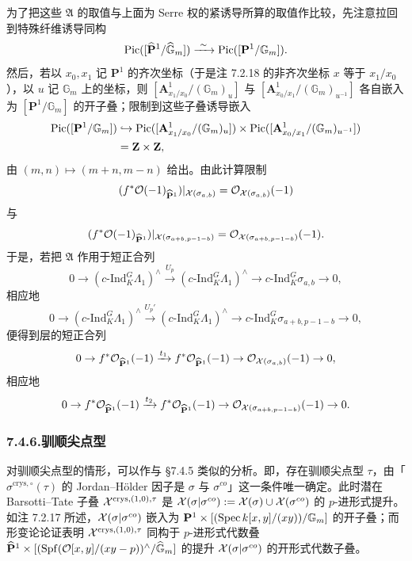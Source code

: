 为了把这些 $\mathfrak A$ 的取值与上面为 Serre 权的紧诱导所算的取值作比较，先注意拉回到特殊纤维诱导同构
\[
\mathrm{Pic}([\widehat{\mathbf P}^1/\widehat{\mathbb G}_m])\xrightarrow{\ \sim\ }\mathrm{Pic}([\mathbf P^1/\mathbb G_m]).
\]
然后，若以 $x_0,x_1$ 记 $\mathbf P^1$ 的齐次坐标（于是注 7.2.18 的非齐次坐标 $x$ 等于 $x_1/x_0$），以 $u$ 记 $\mathbb G_m$ 上的坐标，则 $[\mathbf A^1_{x_1/x_0}/(\mathbb G_m)_u]$ 与 $[\mathbf A^1_{x_0/x_1}/(\mathbb G_m)_{u^{-1}}]$ 各自嵌入为 $[\mathbf P^1/\mathbb G_m]$ 的开子叠；限制到这些子叠诱导嵌入
\[
\begin{aligned}
\mathrm{Pic}([\mathbf P^1/\mathbb G_m])&\hookrightarrow\mathrm{Pic}([\mathbf A^1_{x_1/x_0}/(\mathbb G_m)_u])\times\mathrm{Pic}([\mathbf A^1_{x_0/x_1}/(\mathbb G_m)_{u^{-1}}])\\
&=\mathbf Z\times\mathbf Z,
\end{aligned}
\]
由 $(m,n)\mapsto(m+n,m-n)$ 给出。由此计算限制
\[
(f^*\mathcal{O}(-1)_{\widehat{\mathbf P}^1})|_{\mathcal{X}(\sigma_{a,b})}=\mathcal{O}_{\mathcal{X}(\sigma_{a,b})}(-1)
\]
与
\[
(f^*\mathcal{O}(-1)_{\widehat{\mathbf P}^1})|_{\mathcal{X}(\sigma_{a+b,p-1-b})}=\mathcal{O}_{\mathcal{X}(\sigma_{a+b,p-1-b})}(-1).
\]
于是，若把 $\mathfrak A$ 作用于短正合列
\[
0\to(c\text{-Ind}_K^G\Lambda_1)^\wedge\xrightarrow{U_p}(c\text{-Ind}_K^G\Lambda_1)^\wedge\to c\text{-Ind}_K^G\sigma_{a,b}\to0,
\]
相应地
\[
0\to(c\text{-Ind}_K^G\Lambda_1)^\wedge\xrightarrow{U_p'}(c\text{-Ind}_K^G\Lambda_1)^\wedge\to c\text{-Ind}_K^G\sigma_{a+b,p-1-b}\to0,
\]
便得到层的短正合列
\[
0\to f^*\mathcal{O}_{\widehat{\mathbf P}^1}(-1)\xrightarrow{t_1}f^*\mathcal{O}_{\widehat{\mathbf P}^1}(-1)\to\mathcal{O}_{\mathcal{X}(\sigma_{a,b})}(-1)\to0,
\]
相应地
\[
0\to f^*\mathcal{O}_{\widehat{\mathbf P}^1}(-1)\xrightarrow{t_2}f^*\mathcal{O}_{\widehat{\mathbf P}^1}(-1)\to\mathcal{O}_{\mathcal{X}(\sigma_{a+b,p-1-b})}(-1)\to0.
\]

\subsubsection*{7.4.6.\quad 驯顺尖点型}
对驯顺尖点型的情形，可以作与 §7.4.5 类似的分析。即，存在驯顺尖点型 $\tau$，由「$\sigma^{\mathrm{crys},\circ}(\tau)$ 的 Jordan--Hölder 因子是 $\sigma$ 与 $\sigma^{co}$」这一条件唯一确定。此时潜在 Barsotti--Tate 子叠 $\mathcal{X}^{\mathrm{crys},(1,0),\tau}$ 是 $\mathcal{X}(\sigma|\sigma^{co}):=\mathcal{X}(\sigma)\cup\mathcal{X}(\sigma^{co})$ 的 $p$-进形式提升。如注 7.2.17 所述，$\mathcal{X}(\sigma|\sigma^{co})$ 嵌入为 $\mathbf P^1\times[(\operatorname{Spec} k[x,y]/(xy))/\mathbb G_m]$ 的开子叠；而形变论论证表明 $\mathcal{X}^{\mathrm{crys},(1,0),\tau}$ 同构于 $p$-进形式代数叠 $\widehat{\mathbf P}^1\times[(\operatorname{Spf}(\mathcal{O}[x,y]/(xy-p))^\wedge/\widehat{\mathbb G}_m]$ 的提升 $\mathcal{X}(\sigma|\sigma^{co})$ 的开形式代数子叠。

